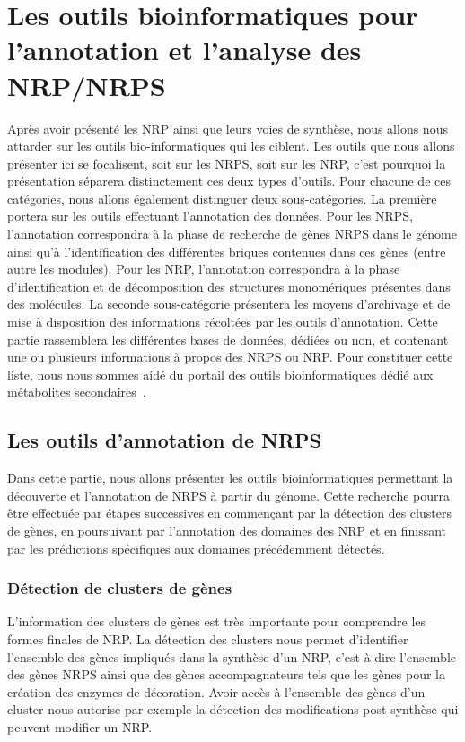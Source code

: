 \section{Les outils bioinformatiques pour l'annotation et l'analyse des NRP/NRPS}
\label{bioanalyse}

Après avoir présenté les NRP ainsi que leurs voies de synthèse, nous allons nous attarder sur les outils bio-informatiques qui les ciblent.
Les outils que nous allons présenter ici se focalisent, soit sur les NRPS, soit sur les NRP, c'est pourquoi la présentation séparera distinctement ces deux types d'outils.
Pour chacune de ces catégories, nous allons également distinguer deux sous-catégories.
La première portera sur les outils effectuant l'annotation des données.
Pour les NRPS, l'annotation correspondra à la phase de recherche de gènes NRPS dans le génome ainsi qu'à l'identification des différentes briques contenues dans ces gènes (entre autre les modules).
Pour les NRP, l'annotation correspondra à la phase d'identification et de décomposition des structures monomériques présentes dans des molécules.
La seconde sous-catégorie présentera les moyens d'archivage et de mise à disposition des informations récoltées par les outils d'annotation.
Cette partie rassemblera les différentes bases de données, dédiées ou non, et contenant une ou plusieurs informations à propos des NRPS ou NRP.
Pour constituer cette liste, nous nous sommes aidé du portail des outils bioinformatiques dédié aux métabolites secondaires~\cite{weber_secondary_2016}.

\subsection{Les outils d'annotation de NRPS}

Dans cette partie, nous allons présenter les outils bioinformatiques permettant la découverte et l'annotation de NRPS à partir du génome.
Cette recherche pourra être effectuée par étapes successives en commençant par la détection des clusters de gènes, en poursuivant par l'annotation des domaines des NRP et en finissant par les prédictions spécifiques aux domaines précédemment détectés.

\subsubsection{Détection de clusters de gènes}

L'information des clusters de gènes est très importante pour comprendre les formes finales de NRP.
La détection des clusters nous permet d'identifier l'ensemble des gènes impliqués dans la synthèse d'un NRP, c'est à dire l'ensemble des gènes NRPS ainsi que des gènes accompagnateurs tels que les gènes pour la création des enzymes de décoration.
Avoir accès à l'ensemble des gènes d'un cluster nous autorise par exemple la détection des modifications post-synthèse qui peuvent modifier un NRP.

